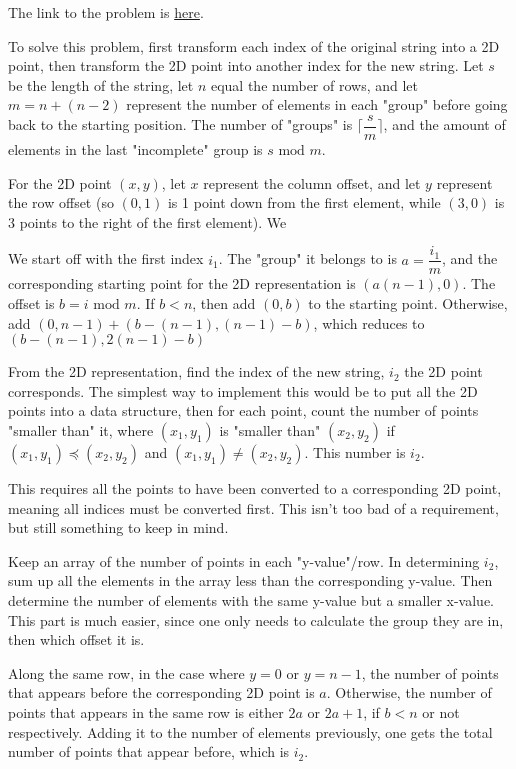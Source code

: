 \documentclass{article}
\newcommand{\ceil}[1]{\lceil #1 \rceil}
\begin{document}
The link to the problem is \href{https://leetcode.com/problems/zigzag-conversion/}{here}.

To solve this problem, first transform each index of the original string into a 2D point, then transform the 2D point into another index for the new string. Let \( s \) be the length of the string, let \( n \) equal the number of rows, and let \( m = n + (n - 2) \) represent the number of elements in each "group" before going back to the starting position. The number of "groups" is \( \ceil{\dfrac{s}{m}} \), and the amount of elements in the last "incomplete" group is \( s \text{ mod } m \).

For the 2D point \( (x, y) \), let \( x \) represent the column offset, and let \( y \) represent the row offset (so \( (0, 1) \) is 1 point down from the first element, while  \( (3, 0) \) is 3 points to the right of the first element). We 

We start off with the first index \( i_1 \). The "group" it belongs to is \( a = \dfrac{i_1}{m} \), and the corresponding starting point for the 2D representation is \( (a(n - 1), 0) \). The offset is \( b = i  \text{ mod } m \). If \( b < n \), then add \( (0, b) \) to the starting point. Otherwise, add \( (0, n - 1) + (b - (n - 1), (n - 1) - b) \), which reduces to \( (b - (n - 1), 2(n - 1) - b) \)

From the 2D representation, find the index of the new string, \( i_2 \) the 2D point corresponds. The simplest way to implement this would be to put all the 2D points into a data structure, then for each point, count the number of points "smaller than" it, where \( (x_1, y_1) \) is "smaller than" \( (x_2, y_2) \) if \( (x_1, y_1) \preceq (x_2, y_2) \) and \( (x_1, y_1) \neq (x_2, y_2) \). This number is \( i_2 \).

This requires all the points to have been converted to a corresponding 2D point, meaning all indices must be converted first. This isn't too bad of a requirement, but still something to keep in mind.

Keep an array of the number of points in each "y-value"/row. In determining \( i_2 \), sum up all the elements in the array less than the corresponding y-value. Then determine the number of elements with the same y-value but a smaller x-value. This part is much easier, since one only needs to calculate the group they are in, then which offset it is.

Along the same row, in the case where  \( y = 0 \) or \( y = n - 1 \), the number of points that appears before the corresponding 2D point is \( a \). Otherwise, the number of points that appears in the same row is either \( 2a \) or \( 2a + 1 \), if \( b < n \) or not respectively. Adding it to the number of elements previously, one gets the total number of points that appear before, which is \( i_2 \).
\end{document}
